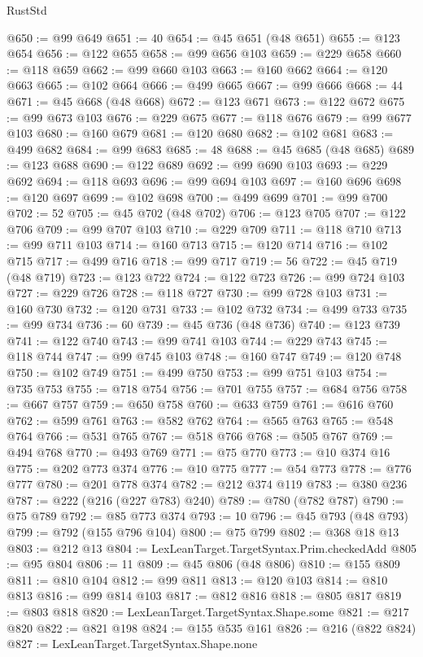 \begin{lexlean}{RustStd}
\begin{coremodule}
@650 := @99 @649
@651 := 40
@654 := @45 @651 (@48 @651)
@655 := @123 @654
@656 := @122 @655
@658 := @99 @656 @103
@659 := @229 @658
@660 := @118 @659
@662 := @99 @660 @103
@663 := @160 @662
@664 := @120 @663
@665 := @102 @664
@666 := @499 @665
@667 := @99 @666
@668 := 44
@671 := @45 @668 (@48 @668)
@672 := @123 @671
@673 := @122 @672
@675 := @99 @673 @103
@676 := @229 @675
@677 := @118 @676
@679 := @99 @677 @103
@680 := @160 @679
@681 := @120 @680
@682 := @102 @681
@683 := @499 @682
@684 := @99 @683
@685 := 48
@688 := @45 @685 (@48 @685)
@689 := @123 @688
@690 := @122 @689
@692 := @99 @690 @103
@693 := @229 @692
@694 := @118 @693
@696 := @99 @694 @103
@697 := @160 @696
@698 := @120 @697
@699 := @102 @698
@700 := @499 @699
@701 := @99 @700
@702 := 52
@705 := @45 @702 (@48 @702)
@706 := @123 @705
@707 := @122 @706
@709 := @99 @707 @103
@710 := @229 @709
@711 := @118 @710
@713 := @99 @711 @103
@714 := @160 @713
@715 := @120 @714
@716 := @102 @715
@717 := @499 @716
@718 := @99 @717
@719 := 56
@722 := @45 @719 (@48 @719)
@723 := @123 @722
@724 := @122 @723
@726 := @99 @724 @103
@727 := @229 @726
@728 := @118 @727
@730 := @99 @728 @103
@731 := @160 @730
@732 := @120 @731
@733 := @102 @732
@734 := @499 @733
@735 := @99 @734
@736 := 60
@739 := @45 @736 (@48 @736)
@740 := @123 @739
@741 := @122 @740
@743 := @99 @741 @103
@744 := @229 @743
@745 := @118 @744
@747 := @99 @745 @103
@748 := @160 @747
@749 := @120 @748
@750 := @102 @749
@751 := @499 @750
@753 := @99 @751 @103
@754 := @735 @753
@755 := @718 @754
@756 := @701 @755
@757 := @684 @756
@758 := @667 @757
@759 := @650 @758
@760 := @633 @759
@761 := @616 @760
@762 := @599 @761
@763 := @582 @762
@764 := @565 @763
@765 := @548 @764
@766 := @531 @765
@767 := @518 @766
@768 := @505 @767
@769 := @494 @768
@770 := @493 @769
@771 := @75 @770
@773 := @10 @374 @16
@775 := @202 @773 @374
@776 := @10 @775
@777 := @54 @773
@778 := @776 @777
@780 := @201 @778 @374
@782 := @212 @374 @119
@783 := @380 @236
@787 := @222 (@216 (@227 @783) @240)
@789 := @780 (@782 @787)
@790 := @75 @789
@792 := @85 @773 @374
@793 := 10
@796 := @45 @793 (@48 @793)
@799 := @792 (@155 @796 @104)
@800 := @75 @799
@802 := @368 @18 @13
@803 := @212 @13
@804 := LexLeanTarget.TargetSyntax.Prim.checkedAdd
@805 := @95 @804
@806 := 11
@809 := @45 @806 (@48 @806)
@810 := @155 @809
@811 := @810 @104
@812 := @99 @811
@813 := @120 @103
@814 := @810 @813
@816 := @99 @814 @103
@817 := @812 @816
@818 := @805 @817
@819 := @803 @818
@820 := LexLeanTarget.TargetSyntax.Shape.some
@821 := @217 @820
@822 := @821 @198
@824 := @155 @535 @161
@826 := @216 (@822 @824)
@827 := LexLeanTarget.TargetSyntax.Shape.none

\end{coremodule}
\end{lexlean}
